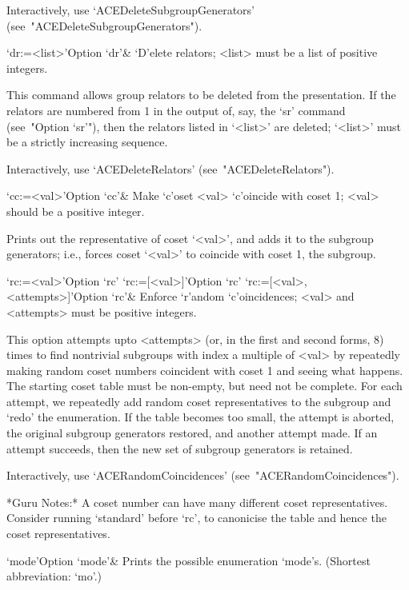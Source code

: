 Interactively,            use            `ACEDeleteSubgroupGenerators'
(see~"ACEDeleteSubgroupGenerators").

\>`dr:=<list>'{Option `dr'}&
`D'elete relators; <list> must be a list of positive integers.

This  command  allows  group  relators  to   be   deleted   from   the
presentation. If the relators are numbered from 1 in  the  output  of,
say, the `sr' command (see~"Option `sr'"), then the relators listed in
`<list>' are deleted; `<list>' must be a strictly increasing sequence.

Interactively, use `ACEDeleteRelators' (see~"ACEDeleteRelators").

\>`cc:=<val>'{Option `cc'}&
Make `c'oset <val> `c'oincide with coset 1; <val> should be a positive
integer.

Prints out the representative of coset `<val>', and  adds  it  to  the
subgroup generators; i.e., forces coset `<val>' to coincide with coset
1, the subgroup.

\>`rc:=<val>'{Option `rc'}
\>`rc:=[<val>]'{Option `rc'}
\>`rc:=[<val>, <attempts>]'{Option `rc'}&
Enforce `r'andom `c'oincidences; <val> and <attempts> must be positive
integers.

This option attempts upto <attempts> (or,  in  the  first  and  second
forms, 8) times to find nontrivial subgroups with index a multiple  of
<val> by repeatedly making random coset numbers coincident with  coset
1 and seeing what happens. The starting coset table must be non-empty,
but need not be complete. For each attempt, we repeatedly  add  random
coset representatives to the subgroup and `redo' the  enumeration.  If
the table becomes too small, the  attempt  is  aborted,  the  original
subgroup generators restored, and another attempt made. If an  attempt
succeeds, then the new set of subgroup generators is retained.

Interactively, use `ACERandomCoincidences' (see~"ACERandomCoincidences").

*Guru Notes:*
A coset number can have many different coset representatives. Consider
running `standard' before `rc', to canonicise the table and hence  the
coset representatives.

\enditems


\beginitems

\>`mode'{Option `mode'}&
Prints the possible enumeration `mode's.
(Shortest abbreviation: `mo'.)

